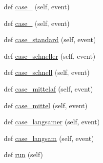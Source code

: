 \begin{DoxyCompactItemize}
\item 
def \hyperlink{class_f_i_n_a_l___g_u_i___w_l_a_n_1_1_w_l_a_n_af3f145b8497ba552defce681ccab0f93}{case\+\_} (self, event)
\item 
def \hyperlink{class_f_i_n_a_l___g_u_i___w_l_a_n_1_1_w_l_a_n_a32d18cb3cdd9763a6259b284e1f712f6}{case\+\_} (self, event)
\item 
def \hyperlink{class_f_i_n_a_l___g_u_i___w_l_a_n_1_1_w_l_a_n_a9ff9a561fae985eb00e1bac777770476}{case\+\_\+standard} (self, event)
\item 
def \hyperlink{class_f_i_n_a_l___g_u_i___w_l_a_n_1_1_w_l_a_n_a384a44af596f649b47f3e86d8699ed96}{case\+\_\+schneller} (self, event)
\item 
def \hyperlink{class_f_i_n_a_l___g_u_i___w_l_a_n_1_1_w_l_a_n_a4ca8c53320e0f6200653b0de263209f1}{case\+\_\+schnell} (self, event)
\item 
def \hyperlink{class_f_i_n_a_l___g_u_i___w_l_a_n_1_1_w_l_a_n_ae440f84a4fdfd4dd8b693ad84d8b85dd}{case\+\_\+mittelaf} (self, event)
\item 
def \hyperlink{class_f_i_n_a_l___g_u_i___w_l_a_n_1_1_w_l_a_n_aaa6564152488bb223e78dbf2fad01126}{case\+\_\+mittel} (self, event)
\item 
def \hyperlink{class_f_i_n_a_l___g_u_i___w_l_a_n_1_1_w_l_a_n_ac23ccd4dbef43aed4a57e85fc080f382}{case\+\_\+langsamer} (self, event)
\item 
def \hyperlink{class_f_i_n_a_l___g_u_i___w_l_a_n_1_1_w_l_a_n_ab059a06421b1cb83fb66e670cc732629}{case\+\_\+langsam} (self, event)
\item 
def \hyperlink{class_f_i_n_a_l___g_u_i___w_l_a_n_1_1_w_l_a_n_ad22709b2e67308af35f55680d5a026e0}{run} (self)
\end{DoxyCompactItemize}

